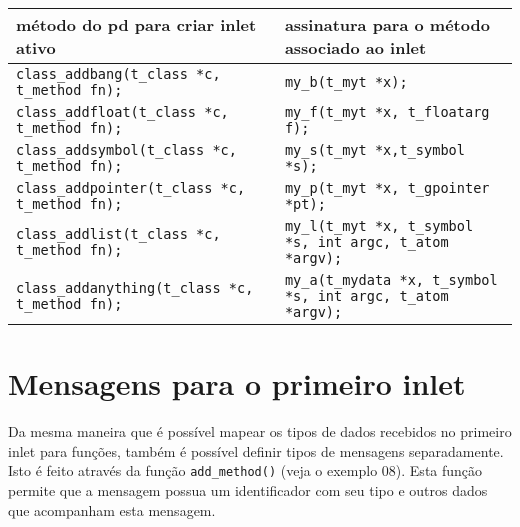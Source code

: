 \begin{center}
\begin{tabular}{|l|l|}
\hline
método do pd para criar inlet ativo & assinatura para o método associado ao
inlet \\
\hline
\texttt{class\_addbang(t\_class *c, t\_method fn);}   & \texttt{my\_b(t\_myt *x);} \\
\texttt{class\_addfloat(t\_class *c, t\_method fn);}  & \texttt{my\_f(t\_myt *x, t\_floatarg f);} \\
\texttt{class\_addsymbol(t\_class *c, t\_method fn);} & \texttt{my\_s(t\_myt *x,t\_symbol *s);} \\
\texttt{class\_addpointer(t\_class *c, t\_method fn);}& \texttt{my\_p(t\_myt *x, t\_gpointer *pt);} \\
\texttt{class\_addlist(t\_class *c, t\_method fn);}   & \texttt{my\_l(t\_myt *x, t\_symbol *s, int argc, t\_atom *argv);} \\
\texttt{class\_addanything(t\_class *c, t\_method fn);}& \texttt{my\_a(t\_mydata *x, t\_symbol *s, int argc, t\_atom *argv);} \\
\hline
\end{tabular}
\end{center}

\section{Mensagens para o primeiro inlet}

Da mesma maneira que é possível mapear os tipos de dados recebidos no primeiro
inlet para funções, também é possível definir tipos de mensagens separadamente.
Isto é feito através da função \texttt{add\_method()} (veja o exemplo 08).
Esta função permite que a mensagem possua um identificador com seu tipo e outros
dados que acompanham esta mensagem.


